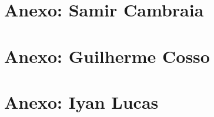 \section{Anexo: Samir Cambraia}



\section{Anexo: Guilherme Cosso}



\section{Anexo: Iyan Lucas}


